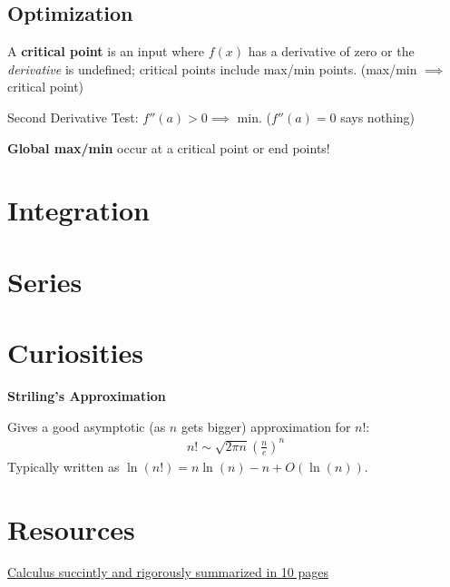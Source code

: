 \documentclass[a4paper, 12pt]{article}
\newcommand{\bt}[1]{\textbf{#1}} %
\newcommand{\eq}[1]{\begin{align*}#1\end{align*}} %
\renewcommand{\eq}[1]{\begin{align*}#1\end{align*}} %
\begin{document}
\subsection*{Optimization}

A \bt{critical point} is an input where $f(x)$ has a derivative of zero or the \textit{derivative} is undefined; critical points include max/min points.
(max/min $\implies$ critical point)

Second Derivative Test: $f''(a) > 0 \implies$ min. ($f''(a) =0$ says nothing)

\bt{Global max/min} occur at a critical point or end points!
\section{Integration}

\section{Series}

\section*{Curiosities}

\bt{Striling's Approximation}

Gives a good asymptotic (as $n$ gets bigger) approximation for $n!$:\\

\eq{
n! \sim \sqrt{2\pi n} (\frac{n}{e})^n
}
Typically written as $\ln(n!) = n\ln(n) - n + O(\ln(n))$. 



\section*{Resources}
\href{http://cr.yp.to/papers/calculus.pdf}{Calculus succintly and rigorously summarized in 10 pages}
\end{document}
